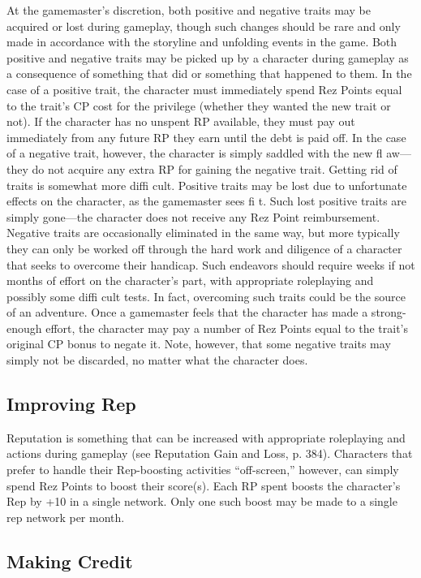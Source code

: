 At the gamemaster’s discretion, both positive and negative traits may be acquired or lost during gameplay, though such changes should be rare and only made in accordance with the storyline and unfolding events in the game. Both positive and negative traits may be picked up by a character during gameplay as a consequence of something that did or something that happened to them. In the case of a positive trait, the character must immediately spend Rez Points equal to the trait’s CP cost for the privilege (whether they wanted the new trait or not). If the character has no unspent RP available, they must pay out immediately from any future RP they earn until the debt is paid off. In the case of a negative trait, however, the character is simply saddled with the new fl aw—they do not acquire any extra RP for gaining the negative trait. Getting rid of traits is somewhat more diffi cult. Positive traits may be lost due to unfortunate effects on the character, as the gamemaster sees fi t. Such lost positive traits are simply gone—the character does not receive any Rez Point reimbursement. Negative traits are occasionally eliminated in the same way, but more typically they can only be worked off through the hard work and diligence of a character that seeks to overcome their handicap. Such endeavors should require weeks if not months of effort on the character’s part, with appropriate roleplaying and possibly some diffi cult tests. In fact, overcoming such traits could be the source of an adventure. Once a gamemaster feels that the character has made a strong-enough effort, the character may pay a number of Rez Points equal to the trait’s original CP bonus to negate it. Note, however, that some negative traits may simply not be discarded, no matter what the character does.

\subsection{Improving Rep}
\label{sec:improving-rep}

Reputation is something that can be increased with appropriate roleplaying and actions during gameplay (see Reputation Gain and Loss, p. 384). Characters that prefer to handle their Rep-boosting activities “off-screen,” however, can simply spend Rez Points to boost their score(s). Each RP spent boosts the character’s Rep by +10 in a single network. Only one such boost may be made to a single rep network per month.

\subsection{Making Credit}
\label{sec:making-credit}

